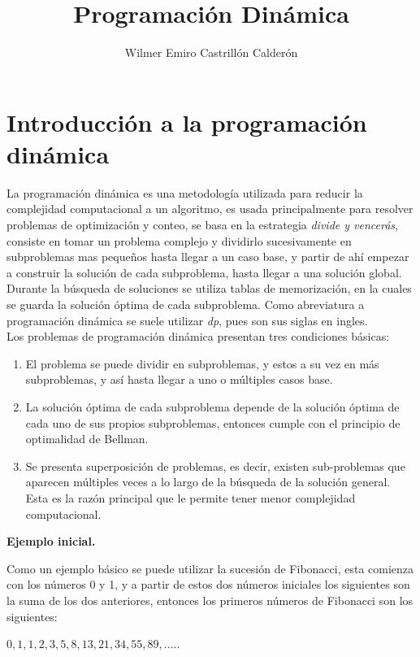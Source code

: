 \documentclass[12pt, a4paper]{article}
\title{\textbf{Programación Dinámica}}
\author{Wilmer Emiro Castrillón Calderón}
\newcommand{\subtitulo}[1]{\begin{center}\textbf{#1}\end{center}}
\begin{document}
	\maketitle
	
	
	\section{Introducción a la programación dinámica}
	\label{dp:introduccion}
	
	La programación dinámica es una metodología utilizada para reducir la complejidad computacional a un
	algoritmo, es usada principalmente para resolver problemas de optimización y conteo,
	se basa en la estrategia \textit{divide y vencerás}, consiste en tomar un problema complejo y dividirlo 
	sucesivamente en subproblemas mas pequeños hasta llegar a un caso base, y partir de ahí empezar a construir la
	solución de cada subproblema, hasta llegar a una solución global. Durante la búsqueda de soluciones
	se utiliza tablas de memorización, en la cuales se guarda la solución óptima de cada subproblema.
	Como abreviatura a programación dinámica se suele utilizar \textit{dp}, pues son sus siglas en ingles.\\
	
	Los problemas de programación dinámica presentan tres condiciones básicas:
	\begin{enumerate}[1.]
		\item El problema se puede dividir en subproblemas, y estos a su vez en más subproblemas, y así hasta llegar
				a uno o múltiples casos base.
		\item La solución óptima de cada subproblema depende de la solución óptima de cada uno de sus
				propios subproblemas, entonces cumple con el principio de optimalidad de Bellman.
		\item Se presenta superposición de problemas, es decir, existen sub-problemas que aparecen múltiples veces
		 		a lo largo de la búsqueda de la solución general. Esta es la razón principal que le permite tener menor  
				complejidad computacional.
	\end{enumerate}
	
	\subtitulo{Ejemplo inicial.}
	
	Como un ejemplo básico se puede utilizar la sucesión de Fibonacci, esta comienza con los números 0 y 1, y a partir
	de estos dos números iniciales los siguientes son la suma de los dos anteriores, entonces los primeros
	números de Fibonacci son los siguientes:
	\begin{center} $0, 1, 1, 2, 3, 5, 8, 13, 21, 34, 55, 89, ..... $ \end{center}
	
\end{document}
